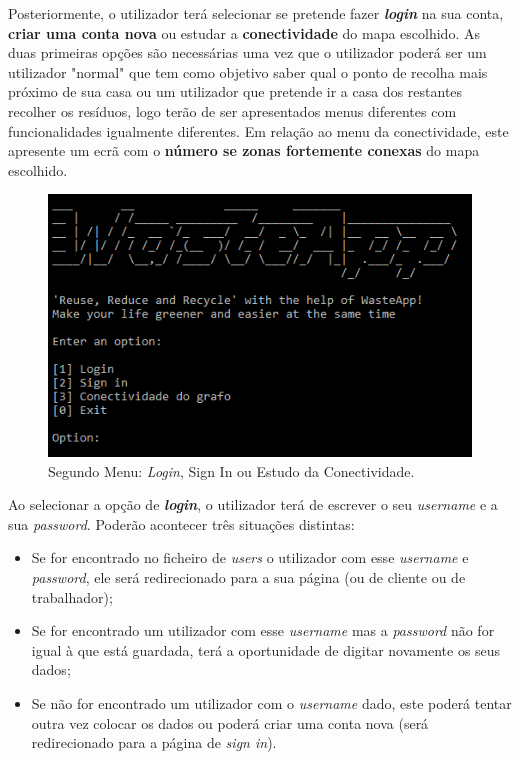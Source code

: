 \documentclass[article, a4paper, 12pt, oneside]{memoir}
\begin{document}
Posteriormente, o utilizador terá selecionar se pretende fazer \textit{\textbf{login}} na sua conta, \textbf{criar uma conta nova} ou estudar a\textbf{ conectividade} do mapa escolhido. As duas primeiras opções são necessárias uma vez que o utilizador poderá ser um utilizador "normal" que tem como objetivo saber qual o ponto de recolha mais próximo de sua casa ou um utilizador que pretende ir a casa dos restantes recolher os resíduos, logo terão de ser apresentados menus diferentes com funcionalidades igualmente diferentes. Em relação ao menu da conectividade, este apresente um ecrã com o \textbf{número se zonas fortemente conexas} do mapa escolhido.

\begin{figure}[h!]
  \centerline{\includegraphics[scale=0.7]{wasteapp_2ndmenu.png}}
  \caption{Segundo Menu: \textit{Login}, Sign In ou Estudo da Conectividade.}
\end{figure}

Ao selecionar a opção de \textbf{\textit{login}}, o utilizador terá de escrever o seu \textit{username} e a sua \textit{password}. Poderão acontecer três situações distintas:

\begin{itemize}
	\item Se for encontrado no ficheiro de \textit{users} o utilizador com esse \textit{username} e \textit{password}, ele será redirecionado para a sua página (ou de cliente ou de trabalhador);
	\item Se for encontrado um utilizador com esse \textit{username} mas a \textit{password} não for igual à que está guardada, terá a oportunidade de digitar novamente os seus dados;
	\item Se não for encontrado um utilizador com o \textit{username} dado, este poderá tentar outra vez colocar os dados ou poderá criar uma conta nova (será redirecionado para a página de \textit{sign in}).
\end{itemize}
\end{document}
